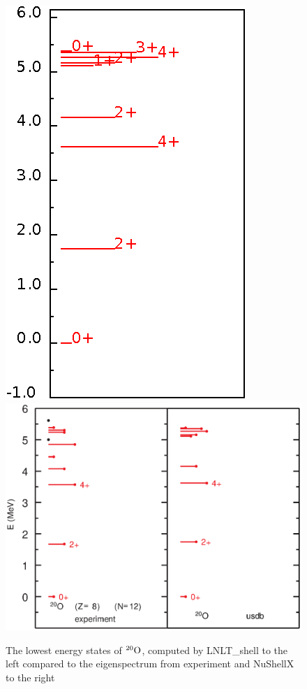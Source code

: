 \begin{figure}[H]
\includegraphics{ox20.eps}
\includegraphics[scale=0.56,trim=0cm 2.3cm 0cm 0cm]{o_20b.eps}
\caption{The lowest energy states of $^{20}\rm{O}$, computed by LNLT\_shell to the left compared to the eigenspectrum from experiment and NuShellX to the right}
\label{fig:ox20eig}
\end{figure}

